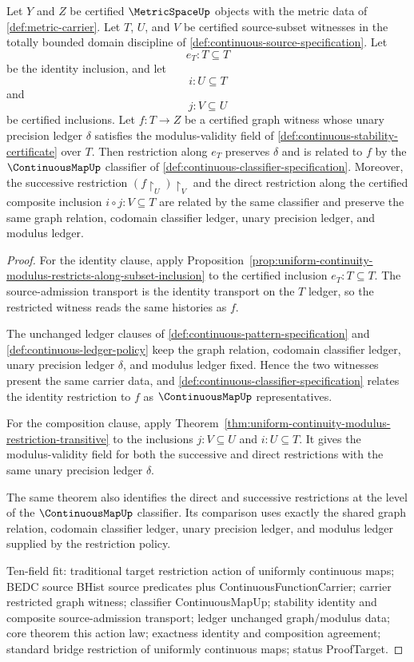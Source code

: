 \begin{theorem}
\label{thm:uniform-continuity-restriction-functorial-action}
Let $Y$ and $Z$ be certified $\MetricSpaceUp$ objects with the metric data of \autoref{def:metric-carrier}. Let $T$, $U$, and $V$ be certified source-subset witnesses in the totally bounded domain discipline of \autoref{def:continuous-source-specification}. Let
$$
e_T:T\subseteq T
$$
be the identity inclusion, and let
$$
i:U\subseteq T
$$
and
$$
j:V\subseteq U
$$
be certified inclusions. Let $f:T\to Z$ be a certified graph witness whose unary precision ledger $\delta$ satisfies the modulus-validity field of \autoref{def:continuous-stability-certificate} over $T$. Then restriction along $e_T$ preserves $\delta$ and is related to $f$ by the $\ContinuousMapUp$ classifier of \autoref{def:continuous-classifier-specification}. Moreover, the successive restriction $(f\!\restriction_U)\!\restriction_V$ and the direct restriction along the certified composite inclusion $i\circ j:V\subseteq T$ are related by the same classifier and preserve the same graph relation, codomain classifier ledger, unary precision ledger, and modulus ledger.
\end{theorem}
\begin{proof}
For the identity clause, apply Proposition~\ref{prop:uniform-continuity-modulus-restricts-along-subset-inclusion} to the certified inclusion $e_T:T\subseteq T$. The source-admission transport is the identity transport on the $T$ ledger, so the restricted witness reads the same histories as $f$.

The unchanged ledger clauses of \autoref{def:continuous-pattern-specification} and \autoref{def:continuous-ledger-policy} keep the graph relation, codomain classifier ledger, unary precision ledger $\delta$, and modulus ledger fixed. Hence the two witnesses present the same carrier data, and \autoref{def:continuous-classifier-specification} relates the identity restriction to $f$ as $\ContinuousMapUp$ representatives.

For the composition clause, apply Theorem~\ref{thm:uniform-continuity-modulus-restriction-transitive} to the inclusions $j:V\subseteq U$ and $i:U\subseteq T$. It gives the modulus-validity field for both the successive and direct restrictions with the same unary precision ledger $\delta$.

The same theorem also identifies the direct and successive restrictions at the level of the $\ContinuousMapUp$ classifier. Its comparison uses exactly the shared graph relation, codomain classifier ledger, unary precision ledger, and modulus ledger supplied by the restriction policy.

Ten-field fit: traditional target restriction action of uniformly continuous maps; BEDC source BHist source predicates plus ContinuousFunctionCarrier; carrier restricted graph witness; classifier ContinuousMapUp; stability identity and composite source-admission transport; ledger unchanged graph/modulus data; core theorem this action law; exactness identity and composition agreement; standard bridge restriction of uniformly continuous maps; status ProofTarget.
\end{proof}
